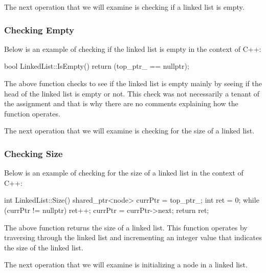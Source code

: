 The next operation that we will examine is checking if a linked list is empty.

\begin{highlight}

\subsubsection*{Checking Empty}

Below is an example of checking if the linked list is empty in the context of C++:

\begin{code}
bool LinkedList::IsEmpty() {
    return (top_ptr_ == nullptr);
}      
\end{code}

The above function checks to see if the linked list is empty mainly by seeing if the head of the linked list is empty or not. This check was not necessarily a tenant of the assignment and that is
why there are no comments explaining how the function operates.

\end{highlight}

The next operation that we will examine is checking for the size of a linked list.

\begin{highlight}

\subsubsection*{Checking Size}

Below is an example of checking for the size of a linked list in the context of C++:

\begin{code}
int LinkedList::Size(){
    shared_ptr<node> currPtr = top_ptr_;
    int ret = 0;
    while (currPtr != nullptr) {
        ret++;
        currPtr = currPtr->next;
    }
    return ret;
}
\end{code}

The above function returns the size of a linked list. This function operates by traversing through the linked list and incrementing an integer value that indicates the size of the linked list.

\end{highlight}

The next operation that we will examine is initializing a node in a linked list.

